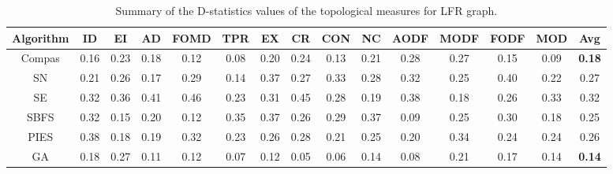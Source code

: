 \begin{table}
\centering
\caption{Summary of the D-statistics values of the topological measures for LFR graph.}
\label{tab_lfr}
\begin{adjustbox}{max width=\textwidth}
\begin{tabular}{c|c c c c c c c c c c c c c | c}
\hline
Algorithm & ID & EI & AD & FOMD & TPR & EX & CR & CON & NC & AODF & MODF & FODF & MOD & Avg\\ \hline
Compas    &  0.16  &  0.23  &  0.18  &  0.12    &  0.08   & 0.20   &  0.24  &  0.13   & 0.21   &  0.28    &  0.27    &   0.15   & 0.09 & {\bf 0.18}   \\ 
SN        &  0.21  &  0.26  &  0.17  &  0.29    &  0.14   & 0.37   & 0.27   & 0.33    &  0.28  &  0.32    & 0.25     & 0.40     &  0.22 & 0.27  \\ 
SE        & 0.32   & 0.36   &  0.41  &   0.46   &   0.23  & 0.31   & 0.45   &  0.28   & 0.19   &   0.38   &  0.18    &  0.26    & 0.33  & 0.32  \\ 
SBFS      &  0.32  &  0.15  &  0.20  &  0.12    &  0.35   & 0.37   & 0.26   &  0.29   & 0.37   &   0.09   & 0.25     &  0.30    & 0.18  & 0.25  \\ 
PIES      & 0.38   & 0.18   &  0.19  &  0.32    &  0.23   &  0.26  & 0.28   &  0.21   & 0.25   & 0.20     & 0.34     &  0.24    &  0.24 & 0.26  \\ 
GA        &  0.18  &  0.27  & 0.11   & 0.12     &  0.07   & 0.12   &  0.05  &  0.06   & 0.14   &  0.08    &  0.21    &  0.17    & 0.14  & {\bf 0.14}  \\ \hline
\end{tabular}
\end{adjustbox}
\vspace{3mm}
\end{table}

